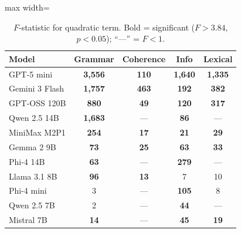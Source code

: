 \documentclass[11pt]{article}
\begin{document}
\begin{table}[H]
\centering
\caption{$F$-statistic for quadratic term. Bold = significant ($F >
3.84$, $p < 0.05$); ``---'' = $F < 1$.}
\label{tab:nonlin}
\small
\begin{adjustbox}{max width=\columnwidth}
\begin{tabular}{@{}lcccc@{}}
\toprule
\textbf{Model} & \textbf{Grammar} & \textbf{Coherence} &
\textbf{Info} & \textbf{Lexical} \\
\midrule
GPT-5 mini     & \textbf{3{,}556} & \textbf{110} & \textbf{1{,}640} & \textbf{1{,}335} \\
Gemini 3 Flash & \textbf{1{,}757} & \textbf{463} & \textbf{192}     & \textbf{382}     \\
GPT-OSS 120B   & \textbf{880}     & \textbf{49}  & \textbf{120}     & \textbf{317}     \\
Qwen 2.5 14B   & \textbf{1{,}683} & ---          & \textbf{86}      & ---              \\
MiniMax M2P1   & \textbf{254}     & \textbf{17}  & \textbf{21}      & \textbf{29}      \\
Gemma 2 9B     & \textbf{73}      & \textbf{25}  & \textbf{63}      & \textbf{33}      \\
Phi-4 14B      & \textbf{63}      & ---          & \textbf{279}     & ---              \\
Llama 3.1 8B   & \textbf{96}      & \textbf{13}  & 7                & 10               \\
Phi-4 mini     & 3                & ---          & \textbf{105}     & 8                \\
Qwen 2.5 7B    & 2                & ---          & \textbf{44}      & ---              \\
Mistral 7B     & \textbf{14}      & ---          & \textbf{45}      & \textbf{19}      \\
\bottomrule
\end{tabular}
\end{adjustbox}
\end{table}
\end{document}
